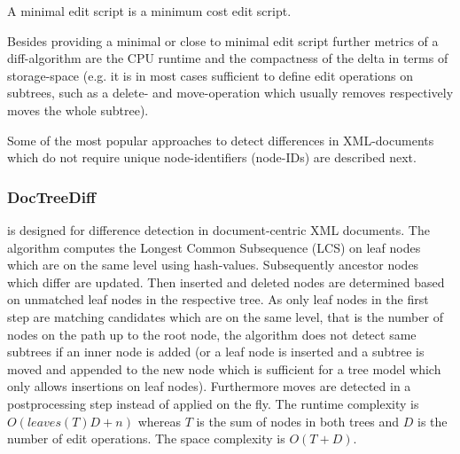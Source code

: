 \begin{mydef}
A minimal edit script is a minimum cost edit script.
\end{mydef}

Besides providing a minimal or close to minimal edit script further metrics of a diff-algorithm are the CPU runtime and the compactness of the delta in terms of storage-space (e.g. it is in most cases sufficient to define edit operations on subtrees, such as a delete- and move-operation which usually removes respectively moves the whole subtree).

Some of the most popular approaches to detect differences in XML-documents which do not require unique node-identifiers (node-IDs) are described next.

\subsubsection{DocTreeDiff\cite{ronnau2009efficient}}
is designed for difference detection in document-centric XML documents. The algorithm computes the Longest Common Subsequence (LCS) on leaf nodes which are on the same level using hash-values. Subsequently ancestor nodes which differ are updated. Then inserted and deleted nodes are determined based on unmatched leaf nodes in the respective tree. As only leaf nodes in the first step are matching candidates which are on the same level, that is the number of nodes on the path up to the root node, the algorithm does not detect same subtrees if an inner node is added (or a leaf node is inserted and a subtree is moved and appended to the new node which is sufficient for a tree model which only allows insertions on leaf nodes). Furthermore moves are detected in a postprocessing step instead of applied on the fly. The runtime complexity is $O(leaves(T)D + n)$ whereas $T$ is the sum of nodes in both trees and $D$ is the number of edit operations. The space complexity is $O(T+D)$.%


